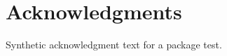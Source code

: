 \documentclass{article}
\author{Fixture Author\\\texttt{fixture at example dot org}}
\begin{document}
\section*{Acknowledgments}
Synthetic acknowledgment text for a package test.

\end{document}
